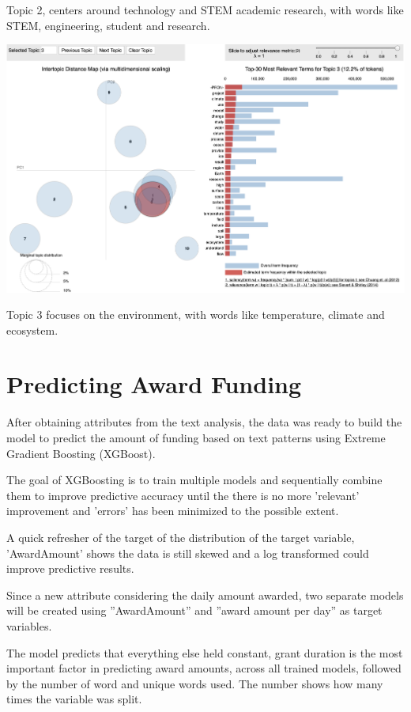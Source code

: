 \documentclass[11pt, oneside]{article}   	%
\begin{document}
 Topic 2, centers around technology and STEM academic research, with words like  STEM, engineering, student and research.
 
  \includegraphics[width=\textwidth]{ldaVisualizationTopic3}
  
  Topic 3 focuses on the environment, with words like temperature, climate and ecosystem.
 
 \section{Predicting Award Funding} 
 
After obtaining attributes from the text analysis, the data was ready to build the model to predict the amount of funding based on text patterns using Extreme Gradient Boosting (XGBoost).

The goal of XGBoosting is to train multiple models and sequentially combine them to improve predictive accuracy until the there is no more 'relevant' improvement and 'errors' has been minimized to the possible extent.

A quick refresher of the target of the distribution of the target variable, 'AwardAmount' shows the data is still skewed and a log transformed could improve predictive results.

Since a new attribute considering the daily amount awarded, two separate models will be created using ''AwardAmount'' and ''award amount per day'' as target variables.

The model predicts that everything else held constant, grant duration is the most important factor in predicting award amounts, across all trained models, followed by the number of word and unique words used. The number shows how many times the variable was split.
\end{document}
